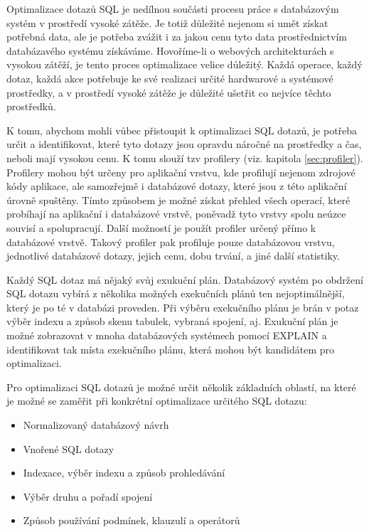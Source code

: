 \documentclass[12pt]{article}
\begin{document}
Optimalizace dotazů SQL je nedílnou součásti procesu práce s databázovým systém v prostředí vysoké zátěže. Je totiž důležité nejenom si umět získat potřebná data, ale je potřeba zvážit i za jakou cenu tyto data prostřednictvím databázavého systému získáváme. Hovoříme-li o webových architekturách s vysokou zátěží, je tento proces optimalizace velice důležitý. Každá operace, každý dotaz, každá akce potřebuje ke své realizaci určité hardwarové a systémové prostředky, a v prostředí vysoké zátěže je důležité ušetřit co nejvíce těchto prostředků.

K tomu, abychom mohli vůbec přistoupit k optimalizaci SQL dotazů, je potřeba určit a identifikovat, které tyto dotazy jsou opravdu náročné na prostředky a čas, neboli mají vysokou cenu. K tomu slouží tzv profilery (viz. kapitola \ref{sec:profiler}). Profilery mohou být určeny pro aplikační vrstvu, kde profilují nejenom zdrojové kódy aplikace, ale samozřejmě i databázové dotazy, které jsou z této aplikační úrovně spuštěny. Tímto způsobem je možné získat přehled všech operací, které probíhají na aplikační i databázové vrstvě, poněvadž tyto vrstvy spolu neúzce souvisí a spolupracují. Další možností je použít profiler určený přímo k databázové vrstvě. Takový profiler pak profiluje pouze databázovou vrstvu, jednotlivé databázové dotazy, jejich cenu, dobu trvání, a jiné další statistiky.

Každý SQL dotaz má nějaký svůj exukuční plán. Databázový systém po obdržení SQL dotazu vybírá z několika možných exekučních plánů ten nejoptimálnější, který je po té v databázi proveden. Při výběru exekučního plánu je brán v potaz výběr indexu a způsob skenu tabulek, vybraná spojení, aj. Exukuční plán je možné zobrazovat v mnoha databázových systémech pomocí EXPLAIN a identifikovat tak místa exekučního plánu, která mohou být kandidátem pro optimalizaci.\cite{optimalizace-sql}

Pro optimalizaci SQL dotazů je možné určit několik základních oblastí, na které je možné se zaměřit při konkrétní optimalizace určitého SQL dotazu:

\begin{itemize}
\item Normalizovaný databázový návrh
\item Vnořené SQL dotazy
\item Indexace, výběr indexu a způsob prohledávání
\item Výběr druhu a pořadí spojení
\item Způsob používání podmínek, klauzulí a operátorů
\end{itemize}
\end{document}
